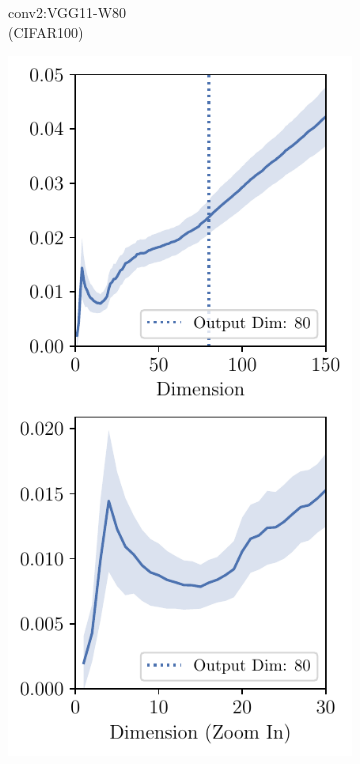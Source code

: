 \begin{figure}[h]
\begin{subfigure}[b]{0.23\textwidth}
        \caption{conv2:VGG11-W80\\(CIFAR100)}
        \label{fig:app_adexp_overlap_early_vgg_cifar100}
    \end{subfigure}
    \begin{subfigure}[b]{0.23\textwidth}
        \centering
        \captionsetup{justification=centering}
        \includegraphics[width=\textwidth]{Appendix_Figures/Overlap_large_model/FailCases/early/CIFAR100_Resnet18W80_nobn_fixlr0.01_conv5_zoom_stacked.pdf}

\end{subfigure}
\end{figure}

